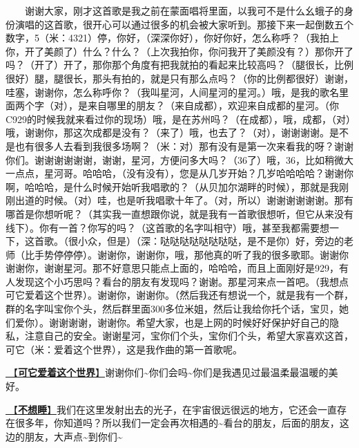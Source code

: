 \documentclass[]{ctexbook}
\begin{document}
  谢谢大家，刚才这首歌是我之前在蒙面唱将里面，以我可不是什么幺蛾子的身份演唱的这首歌，很开心可以通过很多的机会被大家听到。那接下来一起倒数五个数字，5（米：4321）停，你好，（深深你好），你好你好，怎么称呼？（我拍上你，开了美颜了）什么？什么？（上次我拍你，你问我开了美颜没有？）那你开了吗？（开了）开了，那你那个角度有把我就拍的看起来比较高吗？（腿很长，比例很好）腿，腿很长，那头有拍的，就是只有那么点吗？（你的比例都很好）谢谢，哇塞，谢谢你，怎么称呼你？（我叫星河，人间星河的星河。）哦，是我的歌名里面两个字（对），是来自哪里的朋友？（来自成都），欢迎来自成都的星河。（你C929的时候我就来看过你的现场）哦，是在苏州吗？（在成都），哦，成都，（对）哦，谢谢你，那这次成都是没有？（来了）哦，也去了？（对），谢谢谢谢。是不是也有很多人去看到我很多场啊？（米：对）那有没有是第一次来看我的呀？谢谢你们。谢谢谢谢谢谢，谢谢，星河，方便问多大吗？（36了）哦，36，比如稍微大一点点，星河哥。哈哈哈，（没有没有），您是从几岁开始？几岁哈哈哈哈？谢谢你啊，哈哈哈，是什么时候开始听我唱歌的？（从贝加尔湖畔的时候），那就是我刚刚出道的时候。（对）哇，也是听我唱歌十年了。（对，所以）谢谢谢谢谢谢。那有哪首是你想听呢？（其实我一直想跟你说，就是我有一首歌很想听，但它从来没有线下）。你有一首？你写的吗？（这首歌的名字叫相守）哦，甚至我都需要想一下，这首歌。（很小众，但是）（深：哒哒哒哒哒哒哒哒，是不是你）好，旁边的老师（比手势停停停）。谢谢你，谢谢你，哦，那他真的听了我的很多歌耶。谢谢你谢谢你，谢谢星河。那不好意思只能点上面的，哈哈哈，而且上面刚好是929，有人发现这个小巧思吗？看台的朋友有发现吗？谢谢。那星河来点一首吧。（我想点可它爱着这个世界）。谢谢你，谢谢你。（然后我还有想说一个，就是我有一个群，群的名字叫宝你个头，然后群里面300多位米姐，然后让我给你托个话，宝贝，她们爱你）。谢谢谢谢，谢谢你。希望大家，也是上网的时候好好保护好自己的隐私，注意自己的安全。谢谢星河，宝你们个头，宝你们个头，希望大家喜欢这首，可它（米：爱着这个世界），这是我作曲的第一首歌呢。

\hyperref[love-the-world]{🎵【\textbf{可它爱着这个世界}】}谢谢你们\textasciitilde 你们会吗\textasciitilde 你们是我遇见过最温柔最温暖的美好。

\hyperref[donot-want-to-sleep]{🎵【\textbf{不想睡}】}我们在这里发射出去的光子，在宇宙很远很远的地方，它还会一直存在很多年，你知道吗？所以我们一定会再次相遇的\textasciitilde 看台的朋友，后面的朋友，这边的朋友，大声点\textasciitilde 到你们\textasciitilde{}
\end{document}
